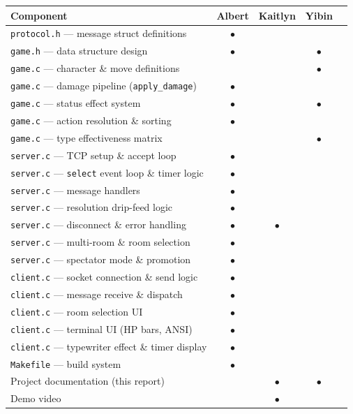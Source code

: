 \documentclass[11pt,letterpaper]{article}
\begin{document}
\begin{center}
\begin{tabular}{@{}lcccc@{}}
\toprule
\textbf{Component} & \textbf{Albert} & \textbf{Kaitlyn} & \textbf{Yibin} \\
\midrule
\texttt{protocol.h} --- message struct definitions & $\bullet$ & & \\
\texttt{game.h} --- data structure design & $\bullet$ & & $\bullet$ \\
\texttt{game.c} --- character \& move definitions & & & $\bullet$ \\
\texttt{game.c} --- damage pipeline (\texttt{apply\_damage}) & $\bullet$ & & \\
\texttt{game.c} --- status effect system & $\bullet$ & & $\bullet$ \\
\texttt{game.c} --- action resolution \& sorting & $\bullet$ & & \\
\texttt{game.c} --- type effectiveness matrix & & & $\bullet$ \\
\texttt{server.c} --- TCP setup \& accept loop & $\bullet$ & & \\
\texttt{server.c} --- \texttt{select} event loop \& timer logic & $\bullet$ & & \\
\texttt{server.c} --- message handlers & $\bullet$ & & \\
\texttt{server.c} --- resolution drip-feed logic & $\bullet$ & & \\
\texttt{server.c} --- disconnect \& error handling & $\bullet$ & $\bullet$ & \\
\texttt{server.c} --- multi-room \& room selection & $\bullet$ & & \\
\texttt{server.c} --- spectator mode \& promotion & $\bullet$ & & \\
\texttt{client.c} --- socket connection \& send logic & $\bullet$ & & \\
\texttt{client.c} --- message receive \& dispatch & $\bullet$ & & \\
\texttt{client.c} --- room selection UI & $\bullet$ & & \\
\texttt{client.c} --- terminal UI (HP bars, ANSI) & $\bullet$ & & \\
\texttt{client.c} --- typewriter effect \& timer display & $\bullet$ & & \\
\texttt{Makefile} --- build system & $\bullet$ & & \\
Project documentation (this report) & & $\bullet$ & $\bullet$ \\
Demo video & & $\bullet$ & \\
\bottomrule
\end{tabular}
\end{center}
\end{document}
